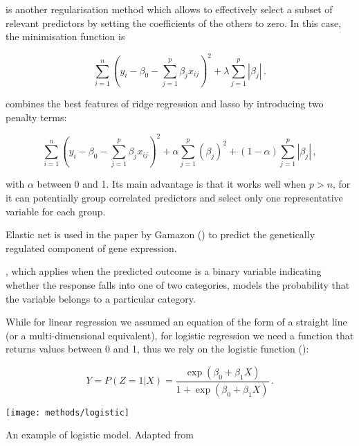 \documentclass[../main.tex]{subfiles}
\begin{document}
 is another regularisation 
method which allows to effectively select a subset of relevant 
predictors by setting the coefficients of the others to zero. In this 
case, the minimisation function is

\begin{equation}
	\sum_{i=1}^{n}\left(y_i-\beta_0-\sum_{j=1}^{p}\beta_jx_{ij}\right)^2+
		\lambda\sum_{j=1}^{p}\left|\beta_j\right|\,.
\end{equation}

 combines the best features of 
ridge regression and lasso by introducing two penalty terms:

\begin{equation}
	\sum_{i=1}^{n}\left(y_i-\beta_0-\sum_{j=1}^{p}\beta_jx_{ij}\right)^2+
		\alpha\sum_{j=1}^{p}\left(\beta_j\right)^2+
		(1-\alpha)\sum_{j=1}^{p}\left|\beta_j\right|\,,
\end{equation}

with $\alpha$ between 0 and 1. Its main advantage is that it works well 
when $p>n$, for it can potentially group correlated predictors and 
select only one representative variable for each group.

Elastic net is used in the paper by Gamazon \etal () 
to predict the genetically regulated component of gene expression.

, which applies when the 
predicted outcome is a binary variable indicating whether the response 
falls into one of two categories, models the probability that the 
variable belongs to a particular category.

While for linear regression we assumed an equation of the form of a 
straight line (or a multi-dimensional equivalent), for logistic 
regression we need a function that returns values between 0 and 1, thus 
we rely on the logistic function ():

\begin{equation}
	Y = P(Z = 1 | X) =
		\frac{\exp(\beta_0+\beta_1X)}{1+\exp(\beta_0+\beta_1X)}\,.
\end{equation}

\begin{marginfigure}
	\texttt{[image: methods/logistic]}
	\caption{An example of logistic model. Adapted from \textcite{James2013}}
\end{marginfigure}
\end{document}
